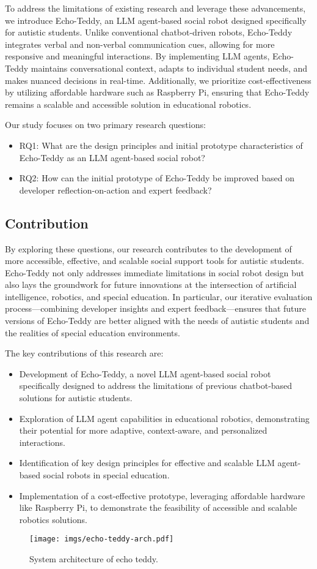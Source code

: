 To address the limitations of existing research and leverage these advancements, we introduce Echo-Teddy, an LLM agent-based social robot designed specifically for autistic students. Unlike conventional chatbot-driven robots, Echo-Teddy integrates verbal and non-verbal communication cues, allowing for more responsive and meaningful interactions. By implementing LLM agents, Echo-Teddy maintains conversational context, adapts to individual student needs, and makes nuanced decisions in real-time. Additionally, we prioritize cost-effectiveness by utilizing affordable hardware such as Raspberry Pi, ensuring that Echo-Teddy remains a scalable and accessible solution in educational robotics.

Our study focuses on two primary research questions:
\begin{itemize}
    \item RQ1: What are the design principles and initial prototype characteristics of Echo-Teddy as an LLM agent-based social robot?
    \item RQ2: How can the initial prototype of Echo-Teddy be improved based on developer reflection-on-action and expert feedback?
\end{itemize}

\subsection{Contribution}

By exploring these questions, our research contributes to the development of more accessible, effective, and scalable social support tools for autistic students. Echo-Teddy not only addresses immediate limitations in social robot design but also lays the groundwork for future innovations at the intersection of artificial intelligence, robotics, and special education. In particular, our iterative evaluation process—combining developer insights and expert feedback—ensures that future versions of Echo-Teddy are better aligned with the needs of autistic students and the realities of special education environments.

The key contributions of this research are:
\begin{itemize}
    \item Development of Echo-Teddy, a novel LLM agent-based social robot specifically designed to address the limitations of previous chatbot-based solutions for autistic students.
    \item Exploration of LLM agent capabilities in educational robotics, demonstrating their potential for more adaptive, context-aware, and personalized interactions.
    \item Identification of key design principles for effective and scalable LLM agent-based social robots in special education.
    \item Implementation of a cost-effective prototype, leveraging affordable hardware like Raspberry Pi, to demonstrate the feasibility of accessible and scalable robotics solutions.
\end{itemize}


\begin{figure*}[hbt!]
    \centering
    \texttt{[image: imgs/echo-teddy-arch.pdf]}
    \caption{System architecture of echo teddy.}
    \label{fig:echo-teddy-arch}
\end{figure*}

